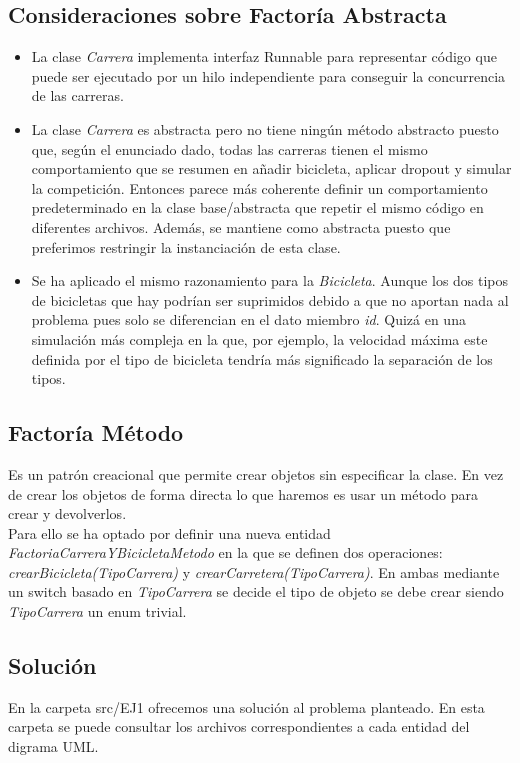 \documentclass{article}
\begin{document}
	\subsection{Consideraciones sobre Factoría Abstracta}
	\begin{itemize}
		\item La clase \textit{Carrera} implementa interfaz Runnable para representar código que puede ser ejecutado por un hilo independiente para conseguir la concurrencia de las carreras.
		\item La clase \textit{Carrera} es abstracta pero no tiene ningún método abstracto puesto que, según el enunciado dado, todas las carreras tienen el mismo comportamiento que se resumen en añadir bicicleta, aplicar dropout y simular la competición. Entonces parece más coherente definir un comportamiento predeterminado en la clase base/abstracta que repetir el mismo código en diferentes archivos. Además, se mantiene como abstracta puesto que preferimos restringir la instanciación de esta clase. 
		\item Se ha aplicado el mismo razonamiento para la \textit{Bicicleta}. Aunque los dos tipos de bicicletas que hay podrían ser suprimidos debido a que no aportan nada al problema pues solo se diferencian en el dato miembro \textit{id}. Quizá en una simulación más compleja en la que, por ejemplo, la velocidad máxima este definida por el tipo de bicicleta tendría más significado la separación de los tipos.
	\end{itemize}


\subsection{Factoría Método}
  Es un patrón creacional que permite crear objetos sin especificar la clase. En vez de crear los objetos de forma directa lo que haremos es usar un método para crear y devolverlos. \\

	Para ello se ha optado por definir una nueva entidad \textit{FactoriaCarreraYBicicletaMetodo} en la que se definen dos operaciones: \textit{crearBicicleta(TipoCarrera)} y \textit{crearCarretera(TipoCarrera)}. En ambas mediante un switch basado en \textit{TipoCarrera} se decide el tipo de objeto se debe crear siendo \textit{TipoCarrera} un enum trivial.  
	
\subsection{Solución}
En la carpeta src/EJ1  ofrecemos una solución al problema planteado. En esta carpeta se puede consultar los archivos correspondientes a cada entidad del digrama UML. \\
\end{document}
